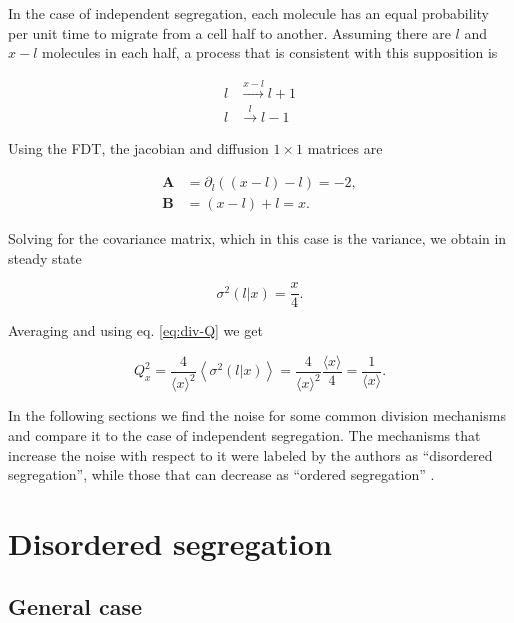 In the case of independent segregation, each molecule has an equal probability per unit time to migrate from a cell half to another. Assuming there are $l$ and $x-l$ molecules in each half, a process that is consistent with this supposition is

\begin{equation}
  \label{eq:div-arr_ind}
  \begin{split}
    l&\xrightarrow{x-l}l+1\\
    l&\xrightarrow{l}l-1
  \end{split}
\end{equation}

Using the FDT, the jacobian and diffusion $1\times1$ matrices are

\begin{equation*}
  \begin{split}
    \mathbf{A} &= \partial_l\left((x-l)-l\right) = -2,\\
    \mathbf{B} &= (x-l)+l = x.
  \end{split}
\end{equation*}

Solving for the covariance matrix, which in this case is the variance, we obtain in steady state

\begin{equation}
  \label{eq:div-var_ind}
  \sigma^2(l|x) = \frac{x}{4}.
\end{equation}

Averaging and using eq. \eqref{eq:div-Q} we get

\begin{equation}
  Q_x^2 = \frac{4}{\langle x\rangle^2}\left\langle\sigma^2(l|x)\right\rangle = \frac{4}{\langle x\rangle^2}\frac{\langle x\rangle}{4} = \frac{1}{\langle x\rangle}.
\end{equation}

In the following sections we find the noise for some common division mechanisms and compare it to the case of independent segregation. The mechanisms that increase the noise with respect to it were labeled by the authors as ``disordered segregation'', while those that can decrease as ``ordered segregation'' \cite{huh11b}.

\section{Disordered segregation}

\subsection{General case}

